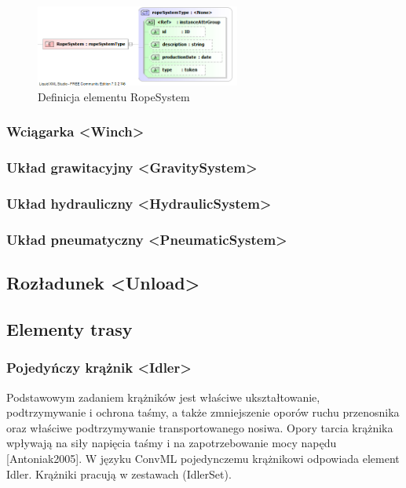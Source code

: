 \documentclass[12pt,a4paper]{article}
\begin{document}
\begin{figure}[h]
  \centering
  \includegraphics[width=0.6\textwidth]{png/liquid/RopeSystem}
  \caption{Definicja elementu RopeSystem}
  \label{fig:ropeSystem-xsd}
\end{figure}


\subsubsection{Wciągarka <Winch>}


\subsubsection{Układ grawitacyjny <GravitySystem>}


\subsubsection{Układ hydrauliczny <HydraulicSystem>}


\subsubsection{Układ pneumatyczny <PneumaticSystem>}


\subsection{Rozładunek <Unload>}


\subsection{Elementy trasy}


\subsubsection{Pojedyńczy krążnik <Idler>}
Podstawowym zadaniem krążników jest właściwe ukształtowanie, podtrzymywanie i ochrona taśmy,
a także zmniejszenie oporów ruchu przenosnika oraz właściwe podtrzymywanie transportowanego
nosiwa. Opory tarcia krążnika wpływają na siły napięcia taśmy i na zapotrzebowanie mocy napędu
[Antoniak2005]. W języku ConvML pojedynczemu krążnikowi odpowiada element Idler. Krążniki
pracują w zestawach (IdlerSet).
\end{document}
